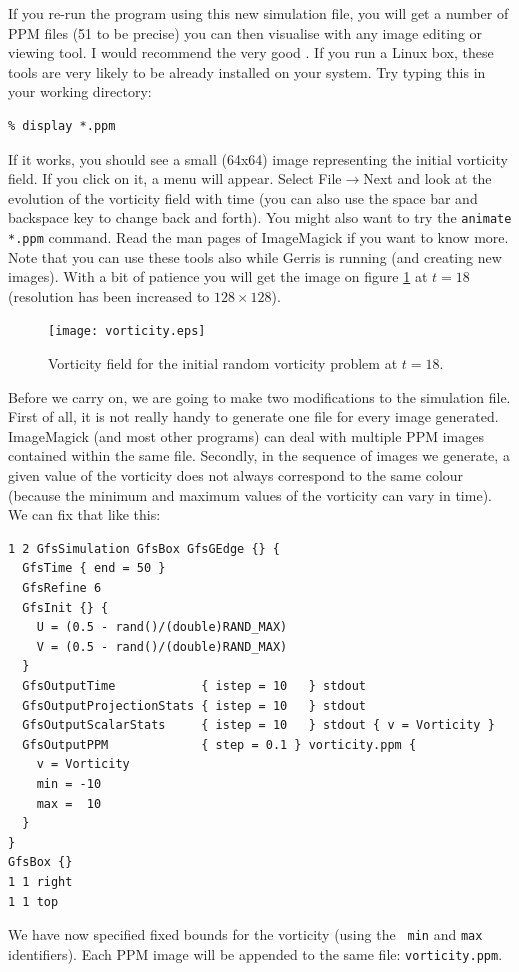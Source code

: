 \documentclass[a4paper]{article}
\begin{document}
If you re-run the program using this new simulation file, you will get
a number of {\sc PPM} files (51 to be precise) you can then visualise
with any image editing or viewing tool. I would recommend the very
good . If you
run a Linux box, these tools are very likely to be already installed
on your system. Try typing this in your working directory:
\begin{verbatim}
% display *.ppm
\end{verbatim}
If it works, you should see a small (64x64) image representing the
initial vorticity field. If you click on it, a menu will
appear. Select File$\rightarrow$Next and look at the evolution of the
vorticity field with time (you can also use the space bar and
backspace key to change back and forth). You might also want to try
the {\tt animate *.ppm} command. Read the man pages of ImageMagick if
you want to know more. Note that you can use these tools also while
Gerris is running (and creating new images). With a bit of patience
you will get the image on figure \ref{vorticity} at $t=18$ (resolution
has been increased to $128\times 128$).
\begin{figure}
\begin{center}
\texttt{[image: vorticity.eps]}
\end{center}
\caption{Vorticity field for the initial random vorticity problem at
$t=18$.}
\label{vorticity}
\end{figure}

Before we carry on, we are going to make two modifications to the
simulation file. First of all, it is not really handy to generate one
file for every image generated. ImageMagick (and most other programs)
can deal with multiple {\sc PPM} images contained within the same
file. Secondly, in the sequence of images we generate, a given value
of the vorticity does not always correspond to the same colour
(because the minimum and maximum values of the vorticity can vary in
time). We can fix that like this:
\begin{verbatim}
1 2 GfsSimulation GfsBox GfsGEdge {} {
  GfsTime { end = 50 }
  GfsRefine 6
  GfsInit {} {
    U = (0.5 - rand()/(double)RAND_MAX)
    V = (0.5 - rand()/(double)RAND_MAX)
  }  
  GfsOutputTime            { istep = 10   } stdout
  GfsOutputProjectionStats { istep = 10   } stdout
  GfsOutputScalarStats     { istep = 10   } stdout { v = Vorticity }
  GfsOutputPPM             { step = 0.1 } vorticity.ppm {
    v = Vorticity 
    min = -10
    max =  10
  }
}
GfsBox {}
1 1 right
1 1 top
\end{verbatim}
We have now specified fixed bounds for the vorticity (using the {\tt
min} and {\tt max} identifiers). Each {\sc PPM} image will be appended to
the same file: {\tt vorticity.ppm}.
\end{document}
